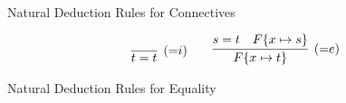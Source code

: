 \begin{definition}
\begin{table}[hbt]
\begin{gather*}
\end{gather*}
\caption{Natural Deduction Rules for Connectives}
\label{tab:natural:deduction:connectives}
\end{table}

\begin{table}[hbt]
	\begin{gather*}
	\infer[({=}i)]{t=t}{}
	\qquad
	\infer[({=}e)]{F\{x\mapsto t\}}{s=t & F\{x\mapsto s\}}
	\end{gather*}
	\caption{Natural Deduction Rules for Equality}
	\label{tab:natural:deduction:equality}
\end{table}


\end{definition}
